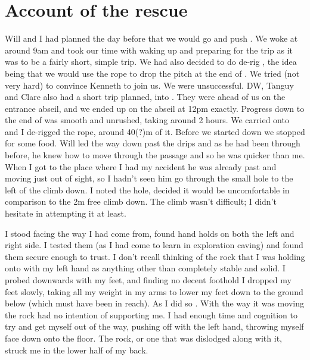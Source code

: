 \section{Account of the rescue}

    Will and I had planned the day before that we would go and push . We woke at around 9am and took our time with waking up and preparing for the trip as it was to be a fairly short, simple trip. We had also decided to do de-rig , the idea being that we would use the rope to drop the pitch at the end of . We tried (not very hard) to convince Kenneth to join us. We were unsuccessful. DW, Tanguy and Clare also had a short trip planned, into . They were ahead of us on the entrance abseil, and we ended up on the abseil at 12pm exactly. Progress down to the end of  was smooth and unrushed, taking around 2 hours. We carried onto  and I de-rigged the rope, around 40(?)m of it. Before we started down  we stopped for some food. Will led the way down past the drips and as he had been through before, he knew how to move through the passage and so he was quicker than me. When I got to the place where I had my accident he was already past and moving just out of sight, so I hadn't seen him go through the small hole to the left of the climb down. I noted the hole, decided it would be uncomfortable in comparison to the 2m free climb down. The climb wasn't difficult; I didn't hesitate in attempting it at least.

    I stood facing the way I had come from, found hand holds on both the left and right side. I tested them (as I had come to learn in exploration caving) and found them secure enough to trust. I don't recall thinking of the rock that I was holding onto with my left hand as anything other than completely stable and solid. I probed downwards with my feet, and finding no decent foothold I dropped my feet slowly, taking all my weight in my arms to lower my feet down to the ground below (which must have been in reach). As I did so . With the way it was moving the rock had no intention of supporting me. I had enough time and cognition to try and get myself out of the way, pushing off with the left hand, throwing myself face down onto the floor. The rock, or one that was dislodged along with it, struck me in the lower half of my back. 

